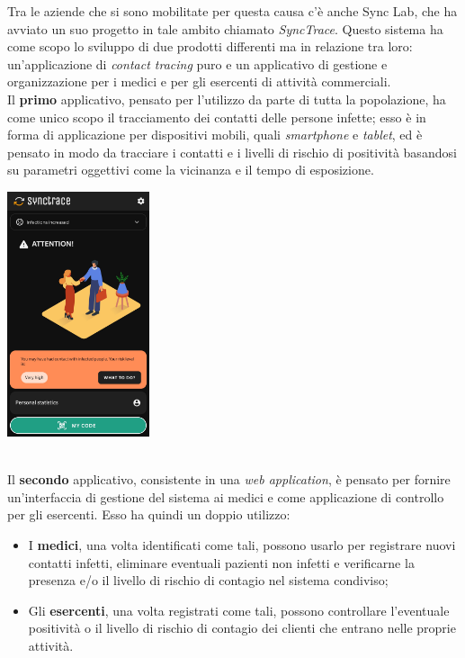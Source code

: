 Tra le aziende che si sono mobilitate per questa causa c'è anche Sync Lab, che ha avviato un suo progetto in tale ambito chiamato \textit{SyncTrace}. Questo sistema ha come scopo lo sviluppo di due prodotti differenti ma in relazione tra loro: un'applicazione di \textit{contact tracing} puro e un applicativo di gestione e organizzazione per i medici e per gli esercenti di attività commerciali. \\
Il \textbf{primo} applicativo, pensato per l'utilizzo da parte di tutta la popolazione, ha come unico scopo il tracciamento dei contatti delle persone infette; esso è in forma di applicazione per dispositivi mobili, quali \textit{smartphone} e \textit{tablet}, ed è pensato in modo da tracciare i contatti e i livelli di rischio di positività basandosi su parametri oggettivi come la vicinanza e il tempo di esposizione. \\

\begin{minipage}{\linewidth}
  \centering
    \includegraphics[height=7.2cm]{immagini/synctraceandroid}
\end{minipage} \\

Il \textbf{secondo} applicativo, consistente in una \textit{web application}, è pensato per fornire un'interfaccia di gestione del sistema ai medici e come applicazione di controllo per gli esercenti. Esso ha quindi un doppio utilizzo:
\begin{itemize}
  \item I \textbf{medici}, una volta identificati come tali, possono usarlo per registrare nuovi contatti infetti, eliminare eventuali pazienti non infetti e verificarne la presenza e/o il livello di rischio di contagio nel sistema condiviso;
  \item Gli \textbf{esercenti}, una volta registrati come tali, possono controllare l'eventuale positività o il livello di rischio di contagio dei clienti che entrano nelle proprie attività.
\end{itemize}


